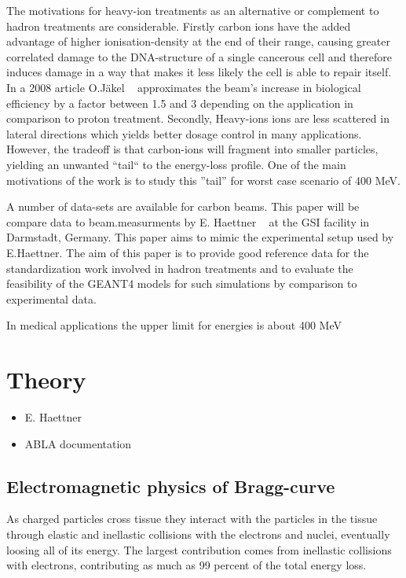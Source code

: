 The motivations for heavy-ion treatments as an alternative or complement to hadron treatments are considerable. Firstly carbon ions have the added advantage of higher ionisation-density at the end of their range, causing greater correlated damage to the DNA-structure of a single cancerous cell and therefore induces damage in a way that makes it less likely the cell is able to repair itself. In a 2008 article O.Jäkel ~\cite{ojakel} approximates the beam's increase in biological efficiency by a factor between 1.5 and 3 depending on the application in comparison to proton treatment. Secondly, Heavy-ions ions are less scattered in lateral directions which yields better dosage control in many applications. However, the tradeoff is that carbon-ions will fragment into smaller particles, yielding an unwanted ``tail`` to the energy-loss profile. One of the main motivations of the work is to study this ''tail'' for worst case scenario of 400 MeV.

A number of data-sets are available for carbon beams. This paper will be compare data to beam.measurments by E. Haettner ~\cite{ehaettner}  at the GSI facility in Darmstadt, Germany. This paper aims to mimic the experimental setup used by E.Haettner. The aim of this paper is  to provide good reference data for the standardization work involved in hadron treatments and to evaluate the feasibility of the GEANT4 models for such simulations by comparison to experimental data.

In medical applications the upper limit for energies is about 400 MeV

\section{Theory}
\begin{itemize}
 \item E. Haettner
 \item ABLA documentation
\end{itemize}
\subsection{Electromagnetic physics of Bragg-curve}
As charged particles cross tissue they interact with the particles in the tissue through elastic and inellastic collisions with the electrons and nuclei, eventually loosing all of its energy. The largest contribution comes from inellastic collisions with electrons, contributing as much as 99 percent of the total energy loss.

